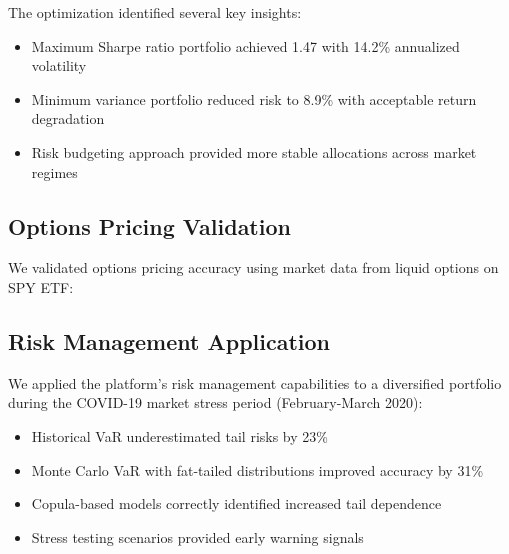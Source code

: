 \documentclass[12pt,a4paper]{article}
\theoremstyle{definition}
\theoremstyle{remark}
\begin{document}
The optimization identified several key insights:
\begin{itemize}
    \item Maximum Sharpe ratio portfolio achieved 1.47 with 14.2\% annualized volatility
    \item Minimum variance portfolio reduced risk to 8.9\% with acceptable return degradation
    \item Risk budgeting approach provided more stable allocations across market regimes
\end{itemize}

\subsection{Options Pricing Validation}

We validated options pricing accuracy using market data from liquid options on SPY ETF:

\begin{table}[H]
\centering
\caption{Options Pricing Model Comparison}
\small
{}
\end{table}

\subsection{Risk Management Application}

We applied the platform's risk management capabilities to a diversified portfolio during the COVID-19 market stress period (February-March 2020):

\begin{itemize}
    \item Historical VaR underestimated tail risks by 23\%
    \item Monte Carlo VaR with fat-tailed distributions improved accuracy by 31\%
    \item Copula-based models correctly identified increased tail dependence
    \item Stress testing scenarios provided early warning signals
\end{itemize}
\end{document}
